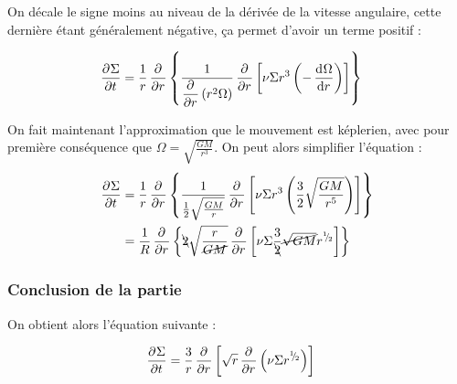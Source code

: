 On décale le signe moins au niveau de la dérivée de la vitesse angulaire, cette dernière étant généralement négative, ça permet d'avoir un terme positif :
\begin{important}
\begin{align}
\mathinner{ \dfrac{\partial{^{}}\Sigma}{\partial{{t}^{}}} } &= \frac{1}{r}\mathinner{ \dfrac{\partial{^{}}}{\partial{{r}^{}}} }\left\{\frac{1}{\mathinner{ \dfrac{\partial{^{}}}{\partial{{r}^{}}} }\left(r^2\Omega\right)} \mathinner{ \dfrac{\partial{^{}}}{\partial{{r}^{}}} }\left[\nu \Sigma r^3 \left(-\mathinner{ \dfrac{\operatorname{d \!}{^{}}\Omega}{\operatorname{d \!}{{r}^{}}} }\right)\right]\right\}
\end{align}
\end{important}

\bigskip

On fait maintenant l'approximation que le mouvement est képlerien, avec pour première conséquence que $\Omega = \sqrt{\frac{GM}{r^3}}$. On peut alors simplifier l'équation : 
\begin{align*}
\dpd{\Sigma}{t} &= \inv{r}\dpd{}{r}\left\{\inv{\inv{2}\sqrt{\frac{GM}{r}}} \dpd{}{r}\left[\nu \Sigma r^3 \left(\frac{3}{2}\sqrt{\frac{GM}{r^5}}\right)\right]\right\}\nonumber\\
&= \inv{R}\dpd{}{r}\left\{\bcancel{2}\sqrt{\frac{r}{\cancel{GM}}} \dpd{}{r}\left[\nu \Sigma \frac{3}{\bcancel{2}}\cancel{\sqrt{GM}}r^\sfrac{1}{2}\right]\right\}\nonumber\\
\end{align*}

\subsubsection{Conclusion de la partie}
On obtient alors l'équation suivante : 
\begin{important}
\begin{align}
\mathinner{ \dfrac{\partial{^{}}\Sigma}{\partial{{t}^{}}} } &=\frac{3}{r}\mathinner{ \dfrac{\partial{^{}}}{\partial{{r}^{}}} }\left[\sqrt{r} \mathinner{ \dfrac{\partial{^{}}}{\partial{{r}^{}}} }\left(\nu \Sigma r^{{}^{1\!\!}/ _{\!2}}\right)\right]
\end{align}
\end{important}